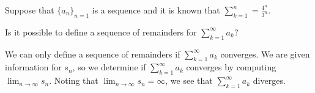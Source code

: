 \documentclass{ximera}
\author{Jim Talamo}
\begin{document}
\begin{exercise}

Suppose that $\{a_n\}_{n=1}$ is a sequence and it is known that $\sum_{k=1}^n = \frac{4^n}{3^n}$.

Is it possible to define a sequence of remainders for $\sum_{k=1}^{\infty} a_k$?

\begin{multipleChoice}
\end{multipleChoice}

\begin{feedback}
We can only define a sequence of remainders if $\sum_{k=1}^{\infty} a_k$ converges.  We are given information for $s_n$, so we determine  if $\sum_{k=1}^{\infty} a_k$ converges by computing $\lim_{n \to \infty} s_n$.  Noting that $\lim_{n \to \infty} s_n = \infty$, we see that  $\sum_{k=1}^{\infty} a_k$ diverges.
\end{feedback}

\end{exercise}
\end{document}
